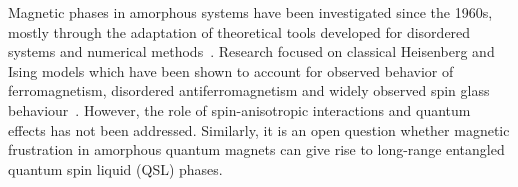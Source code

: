 \documentclass[%
 reprint,
superscriptaddress,
 amsmath,amssymb,
aps,
]{revtex4-2}
\begin{document}
Magnetic phases in amorphous systems have been investigated since the 1960s, mostly through the adaptation of theoretical tools developed for disordered systems \cite{aharony1975critical,Petrakovski1981,kaneyoshi1992introduction,Kaneyoshi2018} and numerical methods~\cite{fahnle1984monte,plascak2000ising}. Research focused on classical Heisenberg and Ising models which have been shown to account for observed behavior of ferromagnetism, disordered antiferromagnetism and widely observed spin glass behaviour~\cite{coey1978amorphous}. However, the role of spin-anisotropic interactions and quantum effects has not been addressed. Similarly, it is an open question whether magnetic frustration in amorphous quantum magnets can give rise to long-range entangled quantum spin liquid (QSL) phases. 


\end{document}
